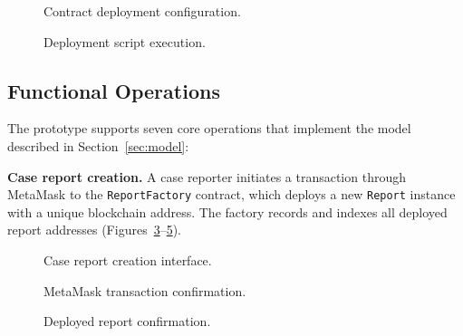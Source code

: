 \documentclass[AMA,LATO1COL]{WileyNJD-v2}
\begin{document}
\begin{figure}[!ht]
\centering
{}
\caption{Contract deployment configuration.}\label{fig:deploy1}
\end{figure}

\begin{figure}[!ht]
\centering
{}
\caption{Deployment script execution.}\label{fig:deploy2}
\end{figure}

\subsection{Functional Operations}\label{subsec:operations}

The prototype supports seven core operations that implement the model described in Section~\ref{sec:model}:

\textbf{Case report creation.} A case reporter initiates a transaction through MetaMask to the \texttt{ReportFactory} contract, which deploys a new \texttt{Report} instance with a unique blockchain address. The factory records and indexes all deployed report addresses (Figures~\ref{fig:create1}--\ref{fig:create3}).

\begin{figure}[!ht]
\centering
{}
\caption{Case report creation interface.}\label{fig:create1}
\end{figure}

\begin{figure}[!ht]
\centering
{}
\caption{MetaMask transaction confirmation.}\label{fig:create2}
\end{figure}

\begin{figure}[!ht]
\centering
{}
\caption{Deployed report confirmation.}\label{fig:create3}
\end{figure}
\end{document}
